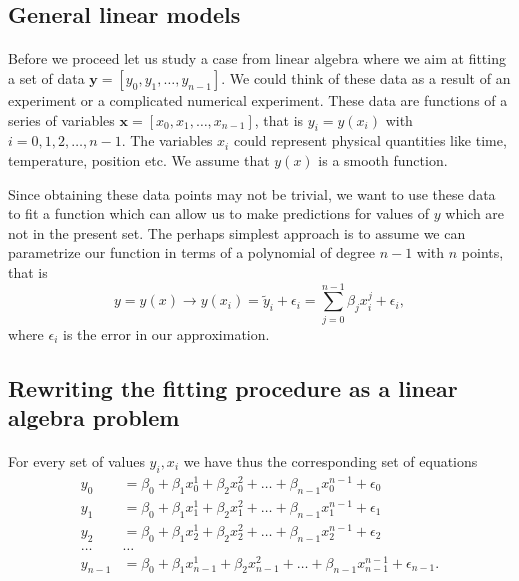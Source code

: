 \documentclass[%
oneside,                 %
final,                   %
10pt]{article}
\begin{document}
\subsection*{General linear models}

\paragraph{}
Before we proceed let us study a case from linear algebra where we aim at fitting a set of data $\bm{y}=[y_0,y_1,\dots,y_{n-1}]$. We could think of these data as a result of an experiment or a complicated numerical experiment. These data are functions of a series of variables $\bm{x}=[x_0,x_1,\dots,x_{n-1}]$, that is $y_i = y(x_i)$ with $i=0,1,2,\dots,n-1$. The variables $x_i$ could represent physical quantities like time, temperature, position etc. We assume that $y(x)$ is a smooth function. 

Since obtaining these data points may not be trivial, we want to use these data to fit a function which can allow us to make predictions for values of $y$ which are not in the present set. The perhaps simplest approach is to assume we can parametrize our function in terms of a polynomial of degree $n-1$ with $n$ points, that is
\[
y=y(x) \rightarrow y(x_i)=\tilde{y}_i+\epsilon_i=\sum_{j=0}^{n-1} \beta_j x_i^j+\epsilon_i,
\]
where $\epsilon_i$ is the error in our approximation.




\subsection*{Rewriting the fitting procedure as a linear algebra problem}

\paragraph{}
For every set of values $y_i,x_i$ we have thus the corresponding set of equations
\begin{align*}
y_0&=\beta_0+\beta_1x_0^1+\beta_2x_0^2+\dots+\beta_{n-1}x_0^{n-1}+\epsilon_0\\
y_1&=\beta_0+\beta_1x_1^1+\beta_2x_1^2+\dots+\beta_{n-1}x_1^{n-1}+\epsilon_1\\
y_2&=\beta_0+\beta_1x_2^1+\beta_2x_2^2+\dots+\beta_{n-1}x_2^{n-1}+\epsilon_2\\
\dots & \dots \\
y_{n-1}&=\beta_0+\beta_1x_{n-1}^1+\beta_2x_{n-1}^2+\dots+\beta_{n-1}x_{n-1}^{n-1}+\epsilon_{n-1}.\\
\end{align*}
\end{document}
